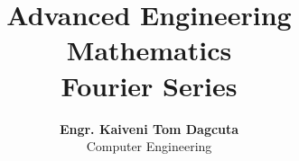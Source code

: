 \documentclass[12pt]{article}
\title{Advanced Engineering Mathematics \\ \large Fourier Series}
\author{\textbf{Engr. Kaiveni Tom Dagcuta} \\ Computer Engineering}
\date{}
\begin{document}


\newpage



\bigskip



\bigskip



\bigskip



\bigskip



\bigskip



\bigskip

% 


% 

% 

% 
\end{document}
